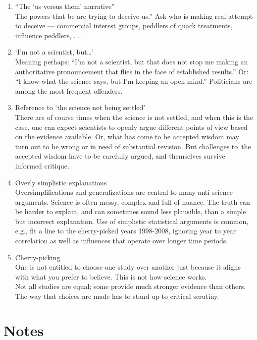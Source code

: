 \documentclass[
  10pt,
  b5paper]{book}
\providecommand{\tightlist}{%
  \setlength{\itemsep}{0pt}\setlength{\parskip}{0pt}}
\begin{document}
\begin{enumerate}
\def\labelenumi{\arabic{enumi}.}
\tightlist
\item
  ``The `us versus them' narrative''\\
  The powers that be are trying to deceive us." Ask who is
  making real attempt to deceive --- commercial interest groups,
  peddlers of quack treatments, influence peddlers, . . .
\item
  `I'm not a scientist, but\ldots{}'\\
  Meaning perhaps: ``I'm not a scientist, but that does not stop me
  making an authoritative pronouncement that flies in the face of
  established results.'' Or: ``I know what the science says, but
  I'm keeping an open mind.'' Politicians are among the most
  frequent offenders.
\item
  Reference to `the science not being settled'\\
  There are of course times when the science is not settled,
  and when this is the case, one can expect scientists to
  openly argue different points of view based on the evidence
  available. Or, what has come to be accepted wisdom
  may turn out to be wrong or in need of substantial
  revision. But challenges to~the accepted wisdom have to be
  carefully argued, and themselves survive informed critique.
\item
  Overly simplistic explanations\\
  Oversimplifications and generalizations are central to many
  anti-science arguments. Science is often messy, complex and full
  of nuance. The truth can be harder to explain, and can sometimes
  sound less plausible, than a simple but incorrect explanation.
  Use of simplistic statistical arguments is common, e.g., fit a
  line to the cherry-picked years 1998-2008, ignoring year to year
  correlation as well as influences that operate over longer time
  periods.
\item
  Cherry-picking\\
  One is not entitled to choose one study over another just because it aligns
  with what you prefer to believe. This is not how science works.\\
  Not all studies are equal; some provide much stronger evidence than others.
  The way that choices are made has to stand up to critical scrutiny.
\end{enumerate}

\hypertarget{notes}{%
\chapter{Notes}\label{notes}}
\end{document}
